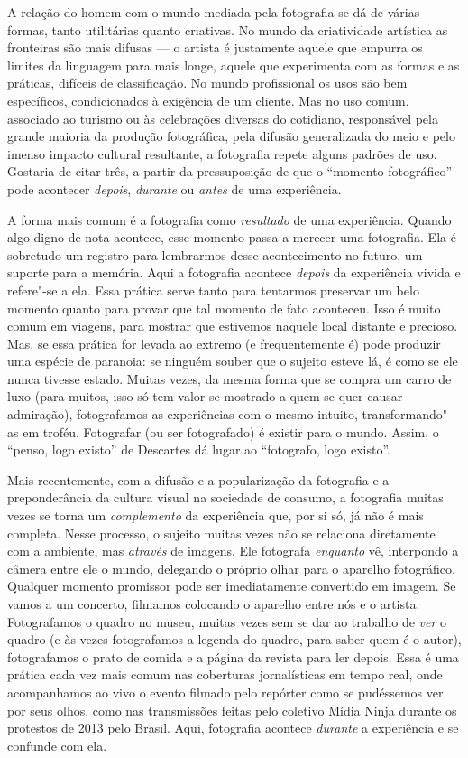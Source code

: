 A relação do homem com o mundo mediada pela fotografia se dá de várias
formas, tanto utilitárias quanto criativas. No mundo da criatividade
artística as fronteiras são mais difusas --- o artista é justamente
aquele que empurra os limites da linguagem para mais longe, aquele que
experimenta com as formas e as práticas, difíceis de classificação. No
mundo profissional os usos são bem específicos, condicionados à
exigência de um cliente. Mas no uso comum, associado ao turismo ou às
celebrações diversas do cotidiano, responsável pela grande maioria da
produção fotográfica, pela difusão generalizada do meio e pelo imenso
impacto cultural resultante, a fotografia repete alguns padrões de uso.
Gostaria de citar três, a partir da pressuposição de que o ``momento
fotográfico'' pode acontecer \emph{depois}, \emph{durante} ou
\emph{antes} de uma experiência.

A forma mais comum é a fotografia como \emph{resultado} de uma
experiência. Quando algo digno de nota acontece, esse momento passa a
merecer uma fotografia. Ela é sobretudo um registro para lembrarmos
desse acontecimento no futuro, um suporte para a memória. Aqui a
fotografia acontece \emph{depois} da experiência vivida e refere"-se a
ela. Essa prática serve tanto para tentarmos preservar um belo momento
quanto para provar que tal momento de fato aconteceu. Isso é muito comum
em viagens, para mostrar que estivemos naquele local distante e
precioso. Mas, se essa prática for levada ao extremo (e frequentemente
é) pode produzir uma espécie de paranoia: se ninguém souber que o
sujeito esteve lá, é como se ele nunca tivesse estado. Muitas vezes, da
mesma forma que se compra um carro de luxo (para muitos, isso só tem
valor se mostrado a quem se quer causar admiração), fotografamos as
experiências com o mesmo intuito, transformando"-as em troféu. Fotografar
(ou ser fotografado) é existir para o mundo. Assim, o ``penso, logo
existo'' de Descartes dá lugar ao ``fotografo, logo existo''.

Mais recentemente, com a difusão e a popularização da fotografia e a
preponderância da cultura visual na sociedade de consumo, a fotografia
muitas vezes se torna um \emph{complemento} da experiência que, por si
só, já não é mais completa. Nesse processo, o sujeito muitas vezes não
se relaciona diretamente com a ambiente, mas \emph{através} de imagens.
Ele fotografa \emph{enquanto} vê, interpondo a câmera entre ele o mundo,
delegando o próprio olhar para o aparelho fotográfico. Qualquer momento
promissor pode ser imediatamente convertido em imagem. Se vamos a um
concerto, filmamos colocando o aparelho entre nós e o artista.
Fotografamos o quadro no museu, muitas vezes sem se dar ao trabalho de
\emph{ver} o quadro (e às vezes fotografamos a legenda do quadro, para
saber quem é o autor), fotografamos o prato de comida e a página da
revista para ler depois. Essa é uma prática cada vez mais comum nas
coberturas jornalísticas em tempo real, onde acompanhamos ao vivo o
evento filmado pelo repórter como se pudéssemos ver por seus olhos, como
nas transmissões feitas pelo coletivo Mídia Ninja durante os protestos
de 2013 pelo Brasil. Aqui, fotografia acontece \emph{durante} a
experiência e se confunde com ela.

